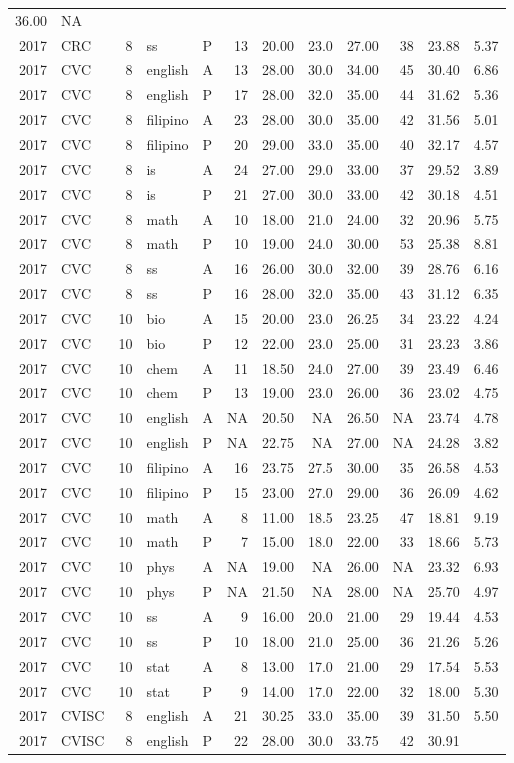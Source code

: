 \documentclass[]{article}
\begin{document}
\begin{longtable}[]{@{}rlrllrrrrrrr@{}}
36.00 & NA\tabularnewline
2017 & CRC & 8 & ss & P & 13 & 20.00 & 23.0 & 27.00 & 38 & 23.88 &
5.37\tabularnewline
2017 & CVC & 8 & english & A & 13 & 28.00 & 30.0 & 34.00 & 45 & 30.40 &
6.86\tabularnewline
2017 & CVC & 8 & english & P & 17 & 28.00 & 32.0 & 35.00 & 44 & 31.62 &
5.36\tabularnewline
2017 & CVC & 8 & filipino & A & 23 & 28.00 & 30.0 & 35.00 & 42 & 31.56 &
5.01\tabularnewline
2017 & CVC & 8 & filipino & P & 20 & 29.00 & 33.0 & 35.00 & 40 & 32.17 &
4.57\tabularnewline
2017 & CVC & 8 & is & A & 24 & 27.00 & 29.0 & 33.00 & 37 & 29.52 &
3.89\tabularnewline
2017 & CVC & 8 & is & P & 21 & 27.00 & 30.0 & 33.00 & 42 & 30.18 &
4.51\tabularnewline
2017 & CVC & 8 & math & A & 10 & 18.00 & 21.0 & 24.00 & 32 & 20.96 &
5.75\tabularnewline
2017 & CVC & 8 & math & P & 10 & 19.00 & 24.0 & 30.00 & 53 & 25.38 &
8.81\tabularnewline
2017 & CVC & 8 & ss & A & 16 & 26.00 & 30.0 & 32.00 & 39 & 28.76 &
6.16\tabularnewline
2017 & CVC & 8 & ss & P & 16 & 28.00 & 32.0 & 35.00 & 43 & 31.12 &
6.35\tabularnewline
2017 & CVC & 10 & bio & A & 15 & 20.00 & 23.0 & 26.25 & 34 & 23.22 &
4.24\tabularnewline
2017 & CVC & 10 & bio & P & 12 & 22.00 & 23.0 & 25.00 & 31 & 23.23 &
3.86\tabularnewline
2017 & CVC & 10 & chem & A & 11 & 18.50 & 24.0 & 27.00 & 39 & 23.49 &
6.46\tabularnewline
2017 & CVC & 10 & chem & P & 13 & 19.00 & 23.0 & 26.00 & 36 & 23.02 &
4.75\tabularnewline
2017 & CVC & 10 & english & A & NA & 20.50 & NA & 26.50 & NA & 23.74 &
4.78\tabularnewline
2017 & CVC & 10 & english & P & NA & 22.75 & NA & 27.00 & NA & 24.28 &
3.82\tabularnewline
2017 & CVC & 10 & filipino & A & 16 & 23.75 & 27.5 & 30.00 & 35 & 26.58
& 4.53\tabularnewline
2017 & CVC & 10 & filipino & P & 15 & 23.00 & 27.0 & 29.00 & 36 & 26.09
& 4.62\tabularnewline
2017 & CVC & 10 & math & A & 8 & 11.00 & 18.5 & 23.25 & 47 & 18.81 &
9.19\tabularnewline
2017 & CVC & 10 & math & P & 7 & 15.00 & 18.0 & 22.00 & 33 & 18.66 &
5.73\tabularnewline
2017 & CVC & 10 & phys & A & NA & 19.00 & NA & 26.00 & NA & 23.32 &
6.93\tabularnewline
2017 & CVC & 10 & phys & P & NA & 21.50 & NA & 28.00 & NA & 25.70 &
4.97\tabularnewline
2017 & CVC & 10 & ss & A & 9 & 16.00 & 20.0 & 21.00 & 29 & 19.44 &
4.53\tabularnewline
2017 & CVC & 10 & ss & P & 10 & 18.00 & 21.0 & 25.00 & 36 & 21.26 &
5.26\tabularnewline
2017 & CVC & 10 & stat & A & 8 & 13.00 & 17.0 & 21.00 & 29 & 17.54 &
5.53\tabularnewline
2017 & CVC & 10 & stat & P & 9 & 14.00 & 17.0 & 22.00 & 32 & 18.00 &
5.30\tabularnewline
2017 & CVISC & 8 & english & A & 21 & 30.25 & 33.0 & 35.00 & 39 & 31.50
& 5.50\tabularnewline
2017 & CVISC & 8 & english & P & 22 & 28.00 & 30.0 & 33.75 & 42 & 30.91

\end{longtable}
\end{document}
